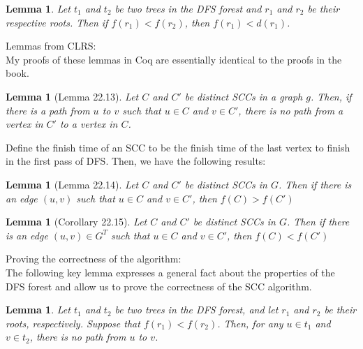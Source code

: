 \documentclass{article}
\newtheorem{lemma}[theorem]{Lemma}
\begin{document}
\begin{lemma}
Let $t_1$ and $t_2$ be two trees in the DFS forest and $r_1$ and $r_2$ be their respective roots. Then if $f(r_1) < f(r_2)$, then $f(r_1) < d(r_1)$.
\end{lemma}
Lemmas from CLRS:
\\My proofs of these lemmas in Coq are essentially identical to the proofs in the book.
\begin{lemma}[Lemma 22.13]
Let $C$ and $C'$ be distinct SCCs in a graph $g$. Then, if there is a path from $u$ to $v$ such that $u\in C$ and $v\in C'$, there is no path from a vertex in $C'$ to a vertex in $C$.
\end{lemma}
Define the finish time of an SCC to be the finish time of the last vertex to finish in the first pass of DFS. Then, we have the following results:
\begin{lemma}[Lemma 22.14]
Let $C$ and $C'$ be distinct SCCs in $G$. Then if there is an edge $(u,v)$ such that $u\in C$ and $v\in C'$, then $f(C) > f(C')$
\end{lemma}
\begin{lemma}[Corollary 22.15]
Let $C$ and $C'$ be distinct SCCs in $G$. Then if there is an edge $(u,v)\in G^T$ such that $u\in C$ and $v\in C'$, then $f(C) < f(C')$
\end{lemma}
Proving the correctness of the algorithm:
\\The following key lemma expresses a general fact about the properties of the DFS forest and allow us to prove the correctness of the SCC algorithm.
\begin{lemma}
Let $t_1$ and $t_2$ be two trees in the DFS forest, and let $r_1$ and $r_2$ be their roots, respectively. Suppose that $f(r_1) < f(r_2)$. Then, for any $u\in t_1$ and $v\in t_2$, there is no path from $u$ to $v$.
\end{lemma}
\end{document}
